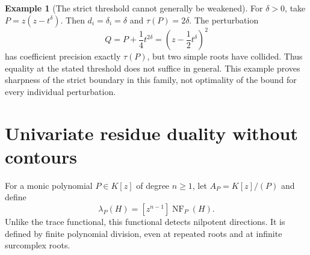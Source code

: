 \documentclass[11pt,letterpaper,oneside]{article}
\numberwithin{equation}{section}
\theoremstyle{definition}
\newtheorem{example}[theorem]{Example}
\theoremstyle{remark}\newtheorem{remark}[theorem]{Remark}
\newcommand{\NF}{\operatorname{NF}}\newcommand{\Tr}{\operatorname{Tr}}
\begin{document}
\begin{example}[The strict threshold cannot generally be weakened]\label{ex:sharp}
For $\delta>0$, take $P=z(z-t^\delta)$. Then
$d_i=\delta_i=\delta$ and $\tau(P)=2\delta$. The perturbation
\[
 Q=P+\frac14t^{2\delta}=\left(z-\frac12t^\delta\right)^2
\]
has coefficient precision exactly $\tau(P)$, but two simple roots have
collided. Thus equality at the stated threshold does not suffice in
general. This example proves sharpness of the strict boundary in this
family, not optimality of the bound for every individual perturbation.
\end{example}

\section{Univariate residue duality without contours}\label{sec:uniresidue}
For a monic polynomial $P\in K[z]$ of degree $n\geq1$, let
$A_P=K[z]/(P)$ and define
\begin{equation}\label{eq:residuetop}
 \lambda_P(H)=[z^{n-1}]\NF_P(H).
\end{equation}
Unlike the trace functional, this functional detects nilpotent directions.
It is defined by finite polynomial division, even at repeated roots and
at infinite surcomplex roots.
\end{document}
